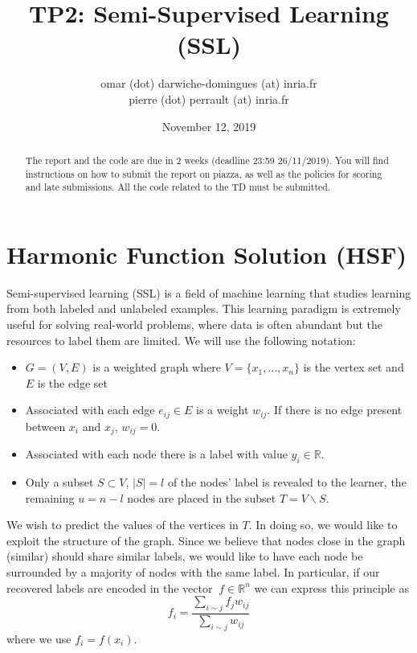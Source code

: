\documentclass{article}
\begin{document}
	\title{TP2: Semi-Supervised Learning (SSL)}
	\author{omar (dot) darwiche-domingues (at) inria.fr \\
			pierre (dot) perrault (at) inria.fr}
	\date{November 12, 2019}
	\maketitle

	\begin{abstract}
		The report and the code are due in 2 weeks (deadline 23:59 26/11/2019).
		You will find instructions on how to submit the report on piazza,
		as well as the policies for scoring and late submissions.
		All the code related to the TD must be submitted.
	\end{abstract}
	
	
	\section{Harmonic Function Solution (HSF)}
	
	Semi-supervised learning (SSL) is a field of machine
	learning that studies learning from both labeled and
	unlabeled examples. This learning paradigm is extremely
	useful for solving real-world problems, where
	data is often abundant but the resources to label them
	are limited.
	We will use the following notation:
	\begin{itemize}
		\item $G=(V, E)$ is a weighted graph where
		$V=\{x_{1}, \ldots, x_{n}\}$ is the vertex set and $E$ is the edge set
		\item Associated with each edge $e_{ij}\in E$ is a weight $w_{ij}.$ If
		there is no edge present between $x_{i}$ and $x_{j}$, $w_{ij}=0$.
		\item Associated with each node there is a label with value $y_{i}\in \mathbb{R}$.
		\item Only a subset $S \subset V$, $|S| = l$ of the nodes' label is revealed to the learner,
		the remaining $u = n - l$ nodes are placed in the subset $T = V\backslash S$.
	\end{itemize}
	We wish to predict the
	values of the vertices in $T$. In doing so, we would like to exploit the
	structure of the graph.
	Since we believe that nodes close in the graph (similar)
	should share similar labels, we would like to have each node be
	surrounded by a majority of nodes with the same label.
	In particular, if our recovered labels are
	encoded in the vector $\:f \in \mathbb{R}^n$ we can express this principle as
	$$
	f_i = \frac{\sum_{i\sim j} f_j w_{ij}}{\sum_{i\sim j} w_{ij}}
	$$
	where we use $f_i = f(x_i)$.
	
\end{document}
